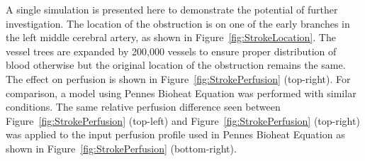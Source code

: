 \documentclass[11pt,english,a4paper,twoside,openright]{report}
\begin{document}
{{{{{{{A single simulation is presented here to demonstrate the potential of further investigation. The location of the obstruction is on one of the early branches in the left middle cerebral artery, as shown in Figure~\ref{fig:StrokeLocation}. The vessel trees are expanded by 200,000 vessels to ensure proper distribution of blood otherwise but the original location of the obstruction remains the same. The effect on perfusion is shown in Figure~\ref{fig:StrokePerfusion} (top-right). For comparison, a model using Pennes Bioheat Equation was performed with similar conditions. The same relative perfusion difference seen between Figure~\ref{fig:StrokePerfusion} (top-left) and Figure~\ref{fig:StrokePerfusion} (top-right) was applied to the input perfusion profile used in Pennes Bioheat Equation as shown in Figure~\ref{fig:StrokePerfusion} (bottom-right).

}}}}}}}
\end{document}
